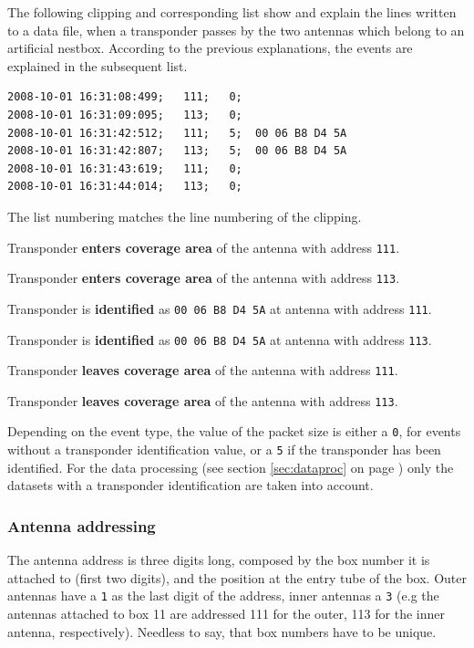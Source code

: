 The following clipping and corresponding list show and explain the lines written to a data file, when a transponder passes by the two antennas which belong to an artificial nestbox. According to the previous explanations, the events are explained in the subsequent list.  

\numcodestyle
\begin{lstlisting}[frame=none]
2008-10-01 16:31:08:499;   111;   0; 
2008-10-01 16:31:09:095;   113;   0; 
2008-10-01 16:31:42:512;   111;   5;  00 06 B8 D4 5A
2008-10-01 16:31:42:807;   113;   5;  00 06 B8 D4 5A
2008-10-01 16:31:43:619;   111;   0; 
2008-10-01 16:31:44:014;   113;   0;
\end{lstlisting}

The list numbering matches the line numbering of the clipping.  

\begin{condensed_enum}
  \item Transponder \textbf{enters coverage area} of the antenna with address \lstinline|111|.
  \item Transponder \textbf{enters coverage area} of the antenna with address \lstinline|113|.
  \item Transponder is \textbf{identified} as \lstinline|00 06 B8 D4 5A| at antenna with address \lstinline|111|.
  \item Transponder is \textbf{identified} as \lstinline|00 06 B8 D4 5A| at antenna with address \lstinline|113|.
  \item Transponder \textbf{leaves coverage area} of the antenna with address \lstinline|111|.
  \item Transponder \textbf{leaves coverage area} of the antenna with address \lstinline|113|. 
\end{condensed_enum}
 
Depending on the event type, the value of the packet size is either a \lstinline|0|, for events without a transponder identification value, or a \lstinline|5| if the transponder has been identified. For the data processing (see section \ref{sec:dataproc} on page \pageref{sec:dataproc}) only the datasets with a transponder identification are taken into account.

\subsubsection{Antenna addressing}
\label{subsubsec:addressing}

The antenna address is three digits long, composed by the box number it is attached to (first two digits), and the position at the entry tube of the box. Outer antennas have a \lstinline|1| as the last digit of the address, inner antennas a \lstinline|3| (e.g the antennas attached to box 11 are addressed 111 for the outer, 113 for the inner antenna, respectively). Needless to say, that box numbers have to be unique.

